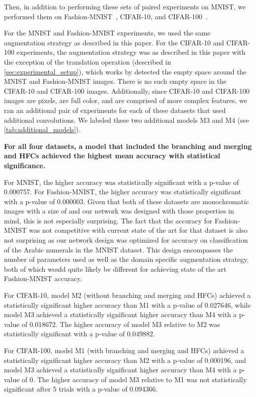 \documentclass{article}
\begin{document}
Then, in addition to performing these sets of paired experiments on MNIST, we performed them on Fashion-MNIST~\cite{Xiao2017}, CIFAR-10, and CIFAR-100~\cite{Krizhevsky2009}.

For the MNIST and Fashion-MNIST experiments, we used the same augmentation strategy as described in this paper.  For the CIFAR-10 and CIFAR-100 experiments, the augmentation strategy was as described in this paper with the exception of the translation operation (described in \autoref{sec:experimental_setup}), which works by detected the empty space around the MNIST and Fashion-MNIST images.  There is no such empty space in the CIFAR-10 and CIFAR-100 images.  Additionally, since CIFAR-10 and CIFAR-100 images are  pixels, are full color, and are comprised of more complex features, we ran an additional pair of experiments for each of these datasets that used additional convolutions.  We labeled these two additional models M3 and M4 (see \autoref{tab:additional_models}).

\textbf{For all four datasets, a model that included the branching and merging and HFCs achieved the highest mean accuracy with statistical significance.}

For MNIST, the higher accuracy was statistically significant with a p-value of 0.000757.  For Fashion-MNIST, the higher accuracy was statistically significant with a p-value of 0.000003.  Given that both of these datasets are monochromatic images with a size of  and our network was designed with those properties in mind, this is not especially surprising.  The fact that the accuracy for Fashion-MNIST was not competitive with current state of the art for that dataset is also not surprising as our network design was optimized for accuracy on classification of the Arabic numerals in the MNIST dataset.  This design encompasses the number of parameters used as well as the domain specific augmentation strategy, both of which would quite likely be different for achieving state of the art Fashion-MNIST accuracy.

For CIFAR-10, model M2 (without branching and merging and HFCs) achieved a statistically significant higher accuracy than M1 with a p-value of 0.027646, while model M3 achieved a statistically significant higher accuracy than M4 with a p-value of 0.018672.  The higher accuracy of model M3 relative to M2 was statistically significant with a p-value of 0.049882.

For CIFAR-100, model M1 (with branching and merging and HFCs) achieved a statistically significant higher accuracy than M2 with a p-value of 0.000196, and model M3 achieved a statistically significant higher accuracy than M4 with a p-value of 0.  The higher accuracy of model M3 relative to M1 was not statistically significant after 5 trials with a p-value of 0.094366.
\end{document}
